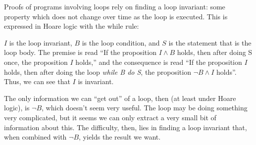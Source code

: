 Proofs of programs involving loops rely on finding a \gls{loop
  invariant}: some property which does not change over time as the
loop is executed. This is expressed in Hoare logic with the while
rule:

\begin{prooftree}
\end{prooftree}

$I$ is the loop invariant, $B$ is the loop condition, and $S$ is the
statement that is the loop body. The premise is read ``If the
proposition $I \land B$ holds, then after doing S once, the
proposition $I$ holds,'' and the consequence is read ``If the
proposition $I$ holds, then after doing the loop \textit{while B do
  S}, the proposition $\lnot B \land I$ holds''. Thus, we can see that
$I$ is invariant.

The only information we can ``get out'' of a loop, then (at least
under Hoare logic), is $\lnot B$, which doesn't seem very useful. The
loop may be doing something very complicated, but it seems we can only
extract a very small bit of information about this. The difficulty,
then, lies in finding a loop invariant that, when combined with $\lnot
B$, yields the result we want.

